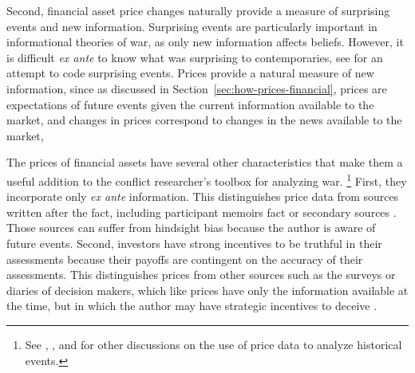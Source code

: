 Second, financial asset price changes naturally provide a measure of surprising events and new information.
Surprising events are particularly important in informational theories of war, as only new information affects beliefs.
However,  it is difficult \textit{ex ante} to know what was surprising to contemporaries, see \textcite{Shirkey2009a} for an attempt to code surprising events.
Prices provide a natural measure of new information, since as discussed in Section~\ref{sec:how-prices-financial}, prices are  expectations of future events given the current information available to the market, and changes in prices correspond to changes in the news available to the market, 

The prices of financial assets have several other characteristics that make them a useful addition to the conflict researcher's toolbox for analyzing war.
\footnote{See \textcite{WillardGuinnaneEtAl1996}, \textcite{north2000introd}, and \textcite{FreyKucher2000} for other  discussions on the use of price data to analyze historical events.} %
First, they incorporate only \textit{ex ante} information.
This distinguishes price data from sources written after the fact, including participant memoirs fact or secondary sources \parencites[1001]{WillardGuinnaneEtAl1996}[][188]{FreyKucher2000a}.
Those sources can suffer from hindsight bias because the author is aware of future events.
Second, investors have strong incentives to be truthful in their assessments because their payoffs are contingent on the accuracy of their assessments.
This distinguishes prices from other sources such as the surveys or diaries of decision makers, which like prices have only the information available at the time, but in which the author may have strategic incentives to deceive \parencite[57]{Reiter2009}.%
